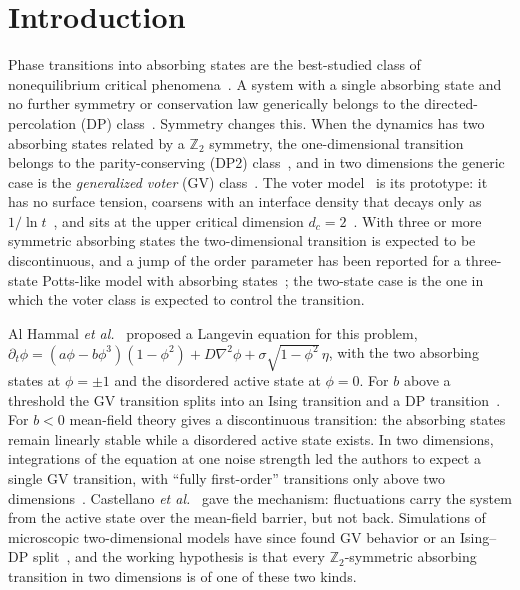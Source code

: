 \documentclass[pre,twocolumn,superscriptaddress,showpacs,floatfix]{revtex4-2}
\begin{document}
\section{Introduction}
\label{sec:intro}

Phase transitions into absorbing states are the best-studied class of nonequilibrium critical
phenomena~\cite{hinrichsen2000,odor2004,lubeck2004,henkel2008}. A system with a single absorbing
state and no further symmetry or conservation law generically belongs to the directed-percolation
(DP) class~\cite{janssen1981,grassberger1982}. Symmetry changes this. When the dynamics has two
absorbing states related by a $\mathbb{Z}_2$ symmetry, the one-dimensional transition belongs to
the parity-conserving (DP2) class~\cite{grassberger1984,menyhard1994,hinrichsen1997}, and in two
dimensions the generic case is the \emph{generalized voter} (GV) class~\cite{dornic2001}. The
voter model~\cite{clifford1973,holley1975,liggett1985} is its prototype: it has no surface
tension, coarsens with an interface density that decays only as $1/\ln
t$~\cite{cox1986,krapivsky1992,dornic2001}, and sits at the upper critical dimension
$d_c = 2$~\cite{janssen2005}. With three or more symmetric absorbing states the two-dimensional
transition is expected to be discontinuous, and a jump of the order parameter has been reported
for a three-state Potts-like model with absorbing states~\cite{lipowski2002,droz2003,azizi2018};
the two-state case is the one in which the voter class is expected to control the transition.

Al Hammal \emph{et al.}~\cite{alhammal2005} proposed a Langevin equation for this problem,
$\partial_t\phi = (a\phi - b\phi^3)(1-\phi^2) + D\nabla^2\phi + \sigma\sqrt{1-\phi^2}\,\eta$, with
the two absorbing states at $\phi = \pm 1$ and the disordered active state at $\phi = 0$. For
$b$ above a threshold the GV transition splits into an Ising transition and a DP
transition~\cite{droz2003,vazquez2008,azizi2020}. For $b<0$ mean-field theory gives a
discontinuous transition: the absorbing states remain linearly stable while a disordered active
state exists. In two dimensions, integrations of the equation at one noise strength led the
authors to expect a single GV transition, with ``fully first-order'' transitions only above two
dimensions~\cite{alhammal2005}. Castellano \emph{et al.}~\cite{castellano2009} gave the
mechanism: fluctuations carry the system from the active state over the mean-field barrier, but
not back. Simulations of microscopic two-dimensional models have since found GV behavior or an
Ising--DP split~\cite{dornic2001,droz2003,vazquez2008,castellano2009,lee2011,azizi2020}, and the
working hypothesis is that every $\mathbb{Z}_2$-symmetric absorbing transition in two dimensions
is of one of these two kinds.
\end{document}
